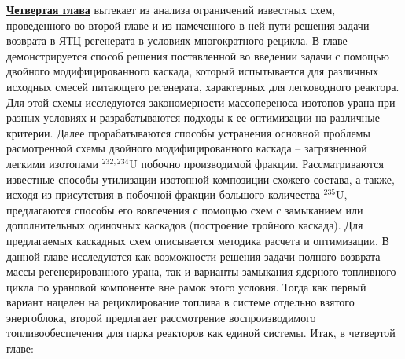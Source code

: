 \underline{\textbf{Четвертая глава}} вытекает из анализа ограничений известных схем, проведенного во второй главе и из намеченного в ней пути решения задачи возврата в ЯТЦ регенерата в условиях многократного рецикла. В главе демонстрируется способ решения поставленной во введении задачи с помощью двойного модифицированного каскада, который испытывается для различных исходных смесей питающего регенерата, характерных для легководного реактора. Для этой схемы исследуются закономерности массопереноса изотопов урана при разных условиях и разрабатываются подходы к ее оптимизации на различные критерии. Далее прорабатываются способы устранения основной проблемы расмотренной схемы двойного модифицированного каскада -- загрязненной легкими изотопами $^{232,234}$U побочно производимой фракции. Рассматриваются известные способы утилизации изотопной композиции схожего состава, а также, исходя из присутствия в побочной фракции большого количества $^{235}$U, предлагаются способы его вовлечения с помощью схем с замыканием или дополнительных одиночных каскадов (построение тройного каскада). Для предлагаемых каскадных схем описывается методика расчета и оптимизации. В данной главе исследуются как возможности решения задачи полного возврата массы регенерированного урана, так и варианты замыкания ядерного топливного цикла по урановой компоненте вне рамок этого условия. Тогда как первый вариант нацелен на рециклирование топлива в системе отдельно взятого энергоблока, второй предлагает рассмотрение воспроизводимого топливообеспечения для парка реакторов как единой системы.
Итак, в четвертой главе:
